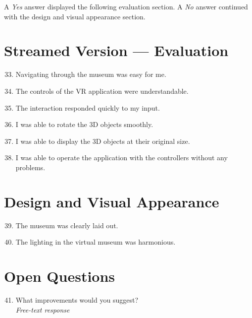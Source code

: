 A \emph{Yes} answer displayed the following evaluation section. A \emph{No} answer continued with the design and visual appearance section.

\section{Streamed Version --- Evaluation}

\begin{enumerate}
  \setcounter{enumi}{32}
  \item Navigating through the museum was easy for me.
  \item The controls of the VR application were understandable.
  \item The interaction responded quickly to my input.
  \item I was able to rotate the 3D objects smoothly.
  \item I was able to display the 3D objects at their original size.
  \item I was able to operate the application with the controllers without any problems.
\end{enumerate}

\section{Design and Visual Appearance}

\begin{enumerate}
  \setcounter{enumi}{38}
  \item The museum was clearly laid out.
  \item The lighting in the virtual museum was harmonious.
\end{enumerate}

\section{Open Questions}

\begin{enumerate}
  \setcounter{enumi}{40}
  \item What improvements would you suggest?\\
  \emph{Free-text response}
\end{enumerate}

\endgroup
